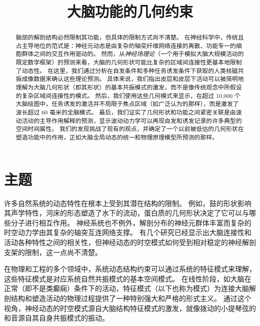 \documentclass[lang=cn,a4paper,newtx,citestyle=gb7714-2015, bibstyle=gb7714-2015]{elegantpaper}
\title{大脑功能的几何约束}
\date{}
\begin{document}
\maketitle

\begin{abstract}
脑部的解剖结构必然限制其功能，但具体的限制方式尚不清楚。
在神经科学中，传统且占主导地位的范式是：神经元动态是由复杂的轴突纤维网络连接的离散、功能专一的细胞群体之间的交互作用驱动的。
然而，从\textit{神经场理论}（一个用于模拟大脑大规模活动的既定数学框架）的预测来看，大脑的几何形状可能比复杂的区域间连接性更基本地限制了动态性。
在这里，我们通过分析在自发条件和多种任务诱发条件下获取的人类核磁共振成像数据来确认这些理论预测。
具体来说，我们指出皮层和皮层下活动可以被简明地理解为大脑几何形状（即其形状）的基本共振模式的激发，而不是像传统观念中所假设的复杂区域间连接性的模式。
然后，我们使用这些几何模式来显示，在超过 10,000 个大脑绘图中，任务诱发的激活并不局限于焦点区域（如广泛认为的那样），而是激发了波长超过 60 毫米的全脑模式。
最后，我们证实了几何形状和功能之间紧密关联是由波动活动的主导作用解释的预测，显示波动动力学可以再现自发和诱发记录的许多典型的空间时间属性。
我们的发现挑战了现有的观点，并确定了一个以前被低估的几何形状在塑造功能中的作用，正如大脑全局动态的统一和物理原理模型所预测的那样。
\end{abstract}

\section{主题}

许多自然系统的动态特性在根本上受到其潜在结构的限制。
例如，鼓的形状影响其声学特性，河床的形态塑造了水下的流动，蛋白质的几何形状决定了它可以与哪些分子进行相互作用\cite{yang2018geometric}。
神经系统也不例外，解剖分布的神经元群体丰富而复杂的时空动力学由其复杂的轴突互连网络支撑\cite{nowack1995neocortical,braitenberg2013cortex}。
有几个研究已经显示出大脑连接性和活动各种特性之间的相关性\cite{damoiseaux2009greater}，但神经动态的时空模式如何受到相对稳定的神经解剖支架的限制，这一点尚不清楚。


在物理和工程的多个领域中，系统动态结构约束可以通过系统的特征模式来理解，这些特征模式是对应系统自然共振模式的基本空间模式\cite{melrose1991electromagnetic}。
在线性阶段，如大脑在正常（即不是类癫痫）条件下的活动\cite{nozari2020brain}，特征模式（以下也称为模式）为连接大脑解剖结构和塑造活动的物理过程提供了一种特别强大和严格的形式主义。
通过这个视角，神经动态的时空模式源自大脑结构特征模式的激发，就像拨动的小提琴弦的和音源自其自身共振模式的振动。
\end{document}
